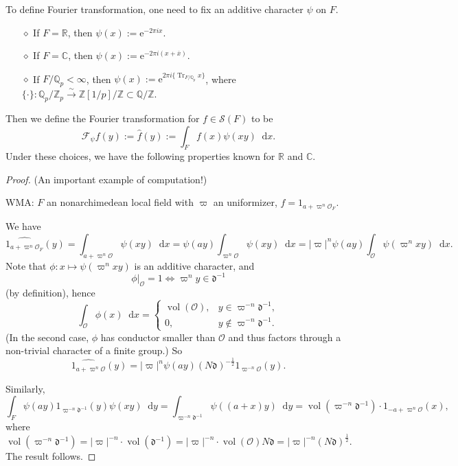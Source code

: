 \documentclass{article}
\newtheorem{theorem}{Theorem}
\theoremstyle{definition}
\theoremstyle{remark}
\renewcommand{\bar}{\overline}
\renewcommand{\hat}{\widehat}
\newcommand{\R}{\mathbb{R}}
\newcommand{\C}{\mathbb{C}}
\newcommand{\Q}{\mathbb{Q}}
\newcommand{\Z}{\mathbb{Z}}
\DeclareMathOperator{\tr}{Tr} %
\newcommand{\isomto}{\stackrel{\sim}{\rightarrow}} %
\newcommand{\dx}{\mathop{}\!\mathrm{d}x}
\newcommand{\dy}{\mathop{}\!\mathrm{d}y}
\newcommand{\diff}{\mathfrak{d}}
\renewcommand{\O}{\mathcal{O}}
\DeclareMathOperator{\vol}{vol}
\newcommand{\e}{\mathrm{e}}
\newcommand{\myit}{$\diamond$}
\begin{document}
To define Fourier transformation, one need to fix an additive character $\psi$ on $F$. 
\begin{enumerate}
    \item [\myit] If $F = \R$, then $\psi(x) := \e^{-2\pi ix}$.
    \item [\myit] If $F = \C$, then $\psi(x) := \e^{-2\pi i(x + \bar{x}) }$.
    \item [\myit] If $F/\Q_p < \infty$, then $\psi(x) := \e^{2\pi i\{\tr_{F/\Q_p}x\}}$, where $\{\cdot\}: \Q_p/\Z_p\isomto \Z[1/p]/\Z \subset \Q/\Z$.
\end{enumerate}
Then we define the Fourier transformation for $f\in\mathcal{S}(F)$ to be \[\mathcal{F}_\psi f (y) := \hat{f}(y) := \int_{F}f(x)\psi(xy)\dx.\]
Under these choices, we have the following properties known for $\R$ and $\C$.
\begin{proof}
    (An important example of computation!)

    WMA: $F$ an nonarchimedean local field with $\varpi$ an uniformizer, $f = 1_{a+\varpi^n\O_F}$. 

    We have \[\hat{1_{a+\varpi^n\O_F}}(y) = \int_{a+\varpi^n\O} \psi(xy)\dx = \psi(ay)\int_{\varpi^n\O}\psi(xy)\dx = |\varpi|^n\psi(ay)\int_{\O}\psi(\varpi^nxy)\dx.\]
    Note that $\phi: x\mapsto\psi(\varpi^nxy)$ is an additive character, and
    \[\phi|_{\O} = 1 \iff \varpi^ny\in\diff^{-1}\]
    (by definition), hence \[\int_\O \phi(x)\dx = \begin{cases}
        \vol(\O), &y\in \varpi^{-n}\diff^{-1},\\
        0, &y\notin\varpi^{-n}\diff^{-1}.
    \end{cases}\]
    (In the second case, $\phi$ has conductor smaller than $\O$ and thus factors through a non-trivial character of a finite group.)
    So \[\hat{1_{a+\varpi^n\O}}(y) = |\varpi|^n\psi(ay)(N\diff)^{-\frac{1}{2}}1_{\varpi^{-n}\O}(y).\]

    Similarly, \[\int_F\psi(ay)1_{\varpi^{-n}\diff^{-1}}(y)\psi(xy)\dy = \int_{\varpi^{-n}\diff^{-1}} \psi((a+x)y)\dy = \vol(\varpi^{-n}\diff^{-1})\cdot 1_{-a + \varpi^n\O}(x),\]
    where \[\vol(\varpi^{-n}\diff^{-1}) = |\varpi|^{-n}\cdot\vol(\diff^{-1}) = |\varpi|^{-n}\cdot \vol(\O)N\diff = |\varpi|^{-n}(N\diff)^{\frac{1}{2}}.\]
    The result follows.
\end{proof}
\end{document}

